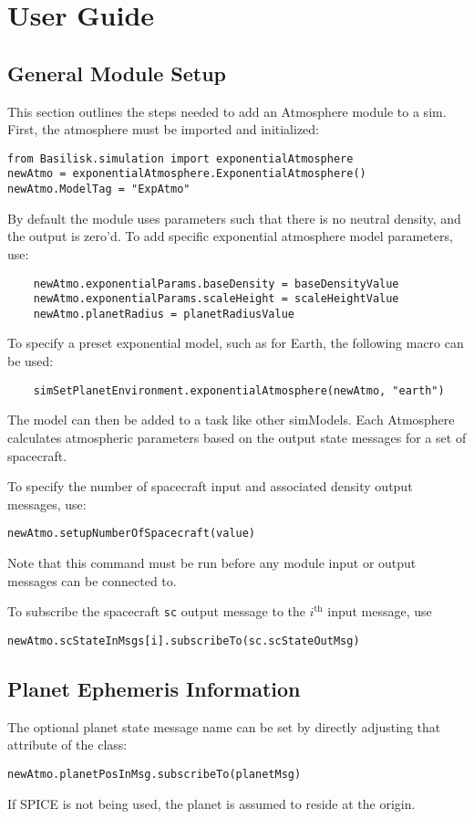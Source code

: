 
\section{User Guide}

\subsection{General Module Setup}
This section outlines the steps needed to add an Atmosphere module to a sim.
First, the atmosphere must be imported and initialized:
\begin{verbatim}
from Basilisk.simulation import exponentialAtmosphere
newAtmo = exponentialAtmosphere.ExponentialAtmosphere()
newAtmo.ModelTag = "ExpAtmo"
\end{verbatim}
By default the module uses parameters such that there is no neutral density, and the output is zero'd.  To add specific exponential atmosphere model parameters, use:
\begin{verbatim}
    newAtmo.exponentialParams.baseDensity = baseDensityValue
    newAtmo.exponentialParams.scaleHeight = scaleHeightValue
    newAtmo.planetRadius = planetRadiusValue
\end{verbatim}
To specify a preset exponential model, such as for Earth, the following macro can be used:
\begin{verbatim}
	simSetPlanetEnvironment.exponentialAtmosphere(newAtmo, "earth")
\end{verbatim}

The model can then be added to a task like other simModels. Each Atmosphere calculates atmospheric parameters based on the output state messages for a set of spacecraft.

To specify the number of spacecraft input and associated density output messages, use:
\begin{verbatim}
newAtmo.setupNumberOfSpacecraft(value)
\end{verbatim}
Note that this command must be run before any module input or output messages can be connected to.

To subscribe the spacecraft {\tt sc} output message to the $i^{\text{th}}$  input message, use
\begin{verbatim}
newAtmo.scStateInMsgs[i].subscribeTo(sc.scStateOutMsg)
\end{verbatim}


\subsection{Planet Ephemeris Information}
The optional planet state message name can be set by directly adjusting that attribute of the class:
\begin{verbatim}
newAtmo.planetPosInMsg.subscribeTo(planetMsg)
\end{verbatim}
If SPICE is not being used, the planet is assumed to reside at the origin.

